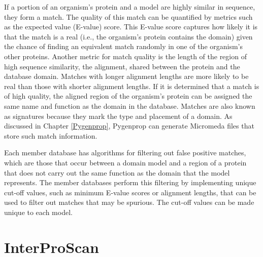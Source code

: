 If a portion of an organism's protein and a model are highly similar in sequence, they form a match. The quality of this match can be quantified by metrics such as the expected value (E-value) score. This E-value score captures how likely it is that the match is a real (i.e., the organism's protein contains the domain) given the chance of finding an equivalent match randomly in one of the organism's other proteins. Another metric for match quality is the length of the region of high sequence similarity, the alignment, shared between the protein and the database domain. Matches with longer alignment lengths are more likely to be real than those with shorter alignment lengths. If it is determined that a match is of high quality, the aligned region of the organism's protein can be assigned the same name and function as the domain in the database. Matches are also known as signatures because they mark the type and placement of a domain. As discussed in Chapter \ref{Pygenprop}, Pygenprop can generate Micromeda files that store such match information.

Each member database has algorithms for filtering out false positive matches, which are those that occur between a domain model and a region of a protein that does not carry out the same function as the domain that the model represents. The member databases perform this filtering by implementing unique cut-off values, such as minimum E-value scores or alignment lengths, that can be used to filter out matches that may be spurious. The cut-off values can be made unique to each model. 


\section{InterProScan}

